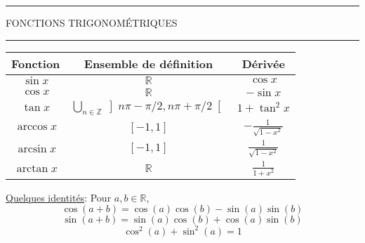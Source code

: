 \documentclass[11pt, addpoints, answers]{exam}
\begin{document}
\begin{questions}
\end{questions}

\newpage
\hrule
\vspace*{.15in}
\begin{center}
	\large\MakeUppercase{Fonctions Trigonométriques}
\end{center}
\vspace*{.15in}
\hrule
\vspace*{.25in}


\renewcommand\arraystretch{3.5}
\begin{table}[H]
\begin{center}
\begin{tabular}{|c|c|c|}
\hline
Fonction & Ensemble de définition& Dérivée \\
\hline\hline
$\sin x$ &$\mathbb{R}$& $\cos x$ \\
\hline
$\cos x$ &$\mathbb{R}$& $-\sin x$ \\
\hline
$\tan x$ &$\bigcup_{n\in\mathbb{Z}}\left]n\pi-\pi/2, n\pi+\pi/2\right[$ & $1+\tan^2 x$ \\
\hline
$\arccos x$ &$[-1,1]$& $-\frac{1}{\sqrt{1-x^2}}$ \\
\hline
$\arcsin x$ &$[-1,1]$& $\frac{1}{\sqrt{1-x^2}}$\\
\hline
$\arctan x$ &$\mathbb{R}$& $\frac{1}{1+x^2}$ \\
\hline
\end{tabular}
\end{center}
\end{table}%
\underline{Quelques identités}: Pour $a,b\in\mathbb{R}$,\\
$$
\cos(a+b) = \cos(a)\cos(b)-\sin(a)\sin(b)
$$
$$
\sin(a+b) = \sin(a)\cos(b)+\cos(a)\sin(b)
$$
$$
\cos^2(a)+\sin^2(a) = 1
$$
\end{document}
